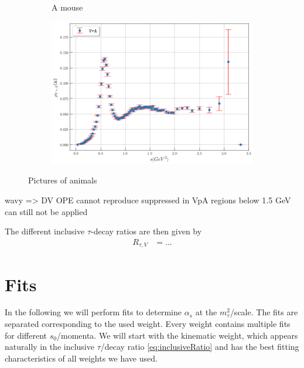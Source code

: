 \documentclass[../../index.tex]{subfiles}
\begin{document}
\begin{figure}
\begin{subfigure}[b]{0.49\textwidth}
        \caption{A mouse}
        \label{fig:mouse}
    \end{subfigure}
    \begin{subfigure}[b]{0.8\textwidth}
      \centering
      \includegraphics[width=\textwidth]{./images/specFuncAleph_VpA.png}
      \label{fig:}
    \end{subfigure}
    \caption{Pictures of animals}\label{fig:animals}
\end{figure}

wavy => DV
OPE cannot reproduce
suppressed in VpA
regions below 1.5 GeV can still not be applied

The different inclusive $\tau$-decay ratios are then given by
\begin{align}
  R_{\tau,V} &= ...
\end{align}


\newpage
\section{Fits}
In the following we will perform fits to determine $\alpha_s$ at the
$m_\tau^2$\-/scale. The fits are separated corresponding to the used weight. Every
weight contains multiple fits for different $s_0$\-/momenta. We will start with
the kinematic weight, which appears naturally in the inclusive $\tau$\-/decay
ratio \cref{eq:inclusiveRatio} and has the best fitting characteristics of all
weights we have used.
\end{document}
